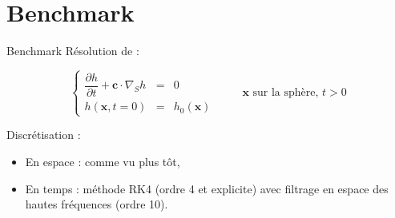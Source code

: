 \documentclass[11pt]{beamer}
\begin{document}
\section{Benchmark}
\begin{frame}{Benchmark}
Résolution de :

$$\left\{
\begin{array}{rcl}
\dfrac{\partial h}{\partial t} + \mathbf{c} \cdot \nabla_S h & = & 0 \\
h(\mathbf{x},t=0) & = & h_0 ( \mathbf{x} )
\end{array}
\right. \hspace{1cm} \mathbf{x} \text{ sur la sphère, } t>0$$

\pause

\begin{block}{Discrétisation : }

\begin{itemize}
\item En espace : comme vu plus tôt,

\item En temps : méthode RK4 (ordre 4 et explicite) avec filtrage en espace des hautes fréquences (ordre 10).
\end{itemize}
\end{block}
\end{frame}
\end{document}
